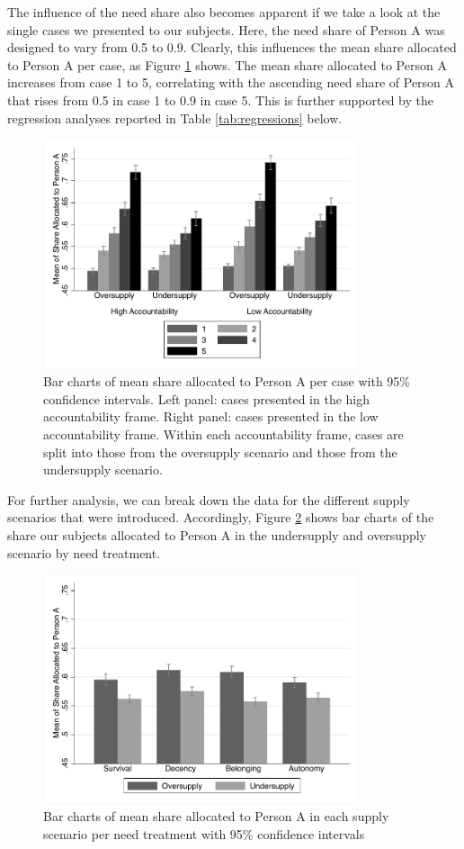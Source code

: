 \documentclass[egregdoesnotlikesansseriftitles]{scrartcl}
\begin{document}
The influence of the need share also becomes apparent if we take a look at the single cases we presented to our subjects.
Here, the need share of Person A was designed to vary from 0.5 to 0.9.
Clearly, this influences the mean share allocated to Person A per case, as Figure \ref{fig:figure_2} shows.
The mean share allocated to Person A increases from case 1 to 5, correlating with the ascending need share of Person A that rises from 0.5 in case 1 to 0.9 in case 5.
This is further supported by the regression analyses reported in Table \ref{tab:regressions} below.

\begin{figure}[ht]
   \centering
   \includegraphics[width=25em]{figures/figure_2.pdf}
   \caption{Bar charts of mean share allocated to Person A per case with 95\% confidence intervals. Left panel: cases presented in the high accountability frame. Right panel: cases presented in the low accountability frame. Within each accountability frame, cases are split into those from the oversupply scenario and those from the undersupply scenario.}
   \label{fig:figure_2}
\end{figure}

For further analysis, we can break down the data for the different supply scenarios that were introduced.
Accordingly, Figure \ref{fig:figure_3} shows bar charts of the share our subjects allocated to Person A in the undersupply and oversupply scenario by need treatment.

\begin{figure}[ht]
   \centering
   \includegraphics[width=25em]{figures/figure_3.pdf}
   \caption{Bar charts of mean share allocated to Person A in each supply scenario per need treatment with 95\% confidence intervals}
   \label{fig:figure_3}
\end{figure}
\end{document}
